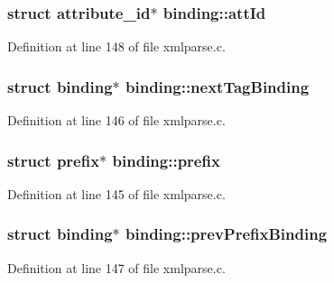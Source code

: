 \subsubsection[{\texorpdfstring{att\+Id}{attId}}]{ struct {\bf attribute\+\_\+id}$\ast$ binding\+::att\+Id}\hypertarget{structbinding_a302c6150bfe8f4db1bedc08623cf07fc}{}\label{structbinding_a302c6150bfe8f4db1bedc08623cf07fc}


Definition at line 148 of file xmlparse.\+c.

\subsubsection[{\texorpdfstring{next\+Tag\+Binding}{nextTagBinding}}]{\setlength{\rightskip}{0pt plus 5cm}struct {\bf binding}$\ast$ binding\+::next\+Tag\+Binding}\hypertarget{structbinding_abfdfde4719bd9a7d3ceee16838fd7a10}{}\label{structbinding_abfdfde4719bd9a7d3ceee16838fd7a10}


Definition at line 146 of file xmlparse.\+c.

\subsubsection[{\texorpdfstring{prefix}{prefix}}]{\setlength{\rightskip}{0pt plus 5cm}struct {\bf prefix}$\ast$ binding\+::prefix}\hypertarget{structbinding_ad4d0033f0aabb4e3d0583ac1ccece910}{}\label{structbinding_ad4d0033f0aabb4e3d0583ac1ccece910}


Definition at line 145 of file xmlparse.\+c.

\subsubsection[{\texorpdfstring{prev\+Prefix\+Binding}{prevPrefixBinding}}]{\setlength{\rightskip}{0pt plus 5cm}struct {\bf binding}$\ast$ binding\+::prev\+Prefix\+Binding}\hypertarget{structbinding_a05786d24cece6279995fec18085518af}{}\label{structbinding_a05786d24cece6279995fec18085518af}


Definition at line 147 of file xmlparse.\+c.

